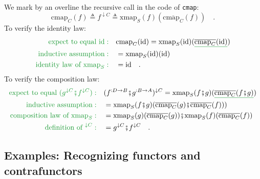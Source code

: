 We mark by an overline the recursive call in the code of \lstinline!cmap!:
\[
\text{cmap}_{C}(f)\triangleq f^{\downarrow C}\triangleq\text{xmap}_{S}(f)(\overline{\text{cmap}_{C}}(f))\quad.
\]
To verify the identity law:
\begin{align*}
{\color{greenunder}\text{expect to equal }\text{id}:}\quad & \text{cmap}_{C}(\text{id})=\text{xmap}_{S}(\text{id})(\gunderline{\overline{\text{cmap}_{C}}(\text{id})})\\
{\color{greenunder}\text{inductive assumption}:}\quad & =\text{xmap}_{S}(\text{id})(\text{id})\\
{\color{greenunder}\text{identity law of }\text{xmap}_{S}:}\quad & =\text{id}\quad.
\end{align*}
To verify the composition law:
\begin{align*}
{\color{greenunder}\text{expect to equal }(g^{\downarrow C}\bef f^{\downarrow C}):}\quad & (f^{:D\rightarrow B}\bef g^{:B\rightarrow A})^{\downarrow C}=\text{xmap}_{S}(f\bef g)(\gunderline{\overline{\text{cmap}_{C}}(f\bef g)})\\
{\color{greenunder}\text{inductive assumption}:}\quad & =\text{xmap}_{S}(f\bef g)(\overline{\text{cmap}_{C}}(g)\bef\overline{\text{cmap}_{C}}(f)))\\
{\color{greenunder}\text{composition law of }\text{xmap}_{S}:}\quad & =\text{xmap}_{S}(g)(\overline{\text{cmap}_{C}}(g))\bef\text{xmap}_{S}(f)(\overline{\text{cmap}_{C}}(f))\\
{\color{greenunder}\text{definition of }^{\downarrow C}:}\quad & =g^{\downarrow C}\bef f^{\downarrow C}\quad.
\end{align*}


\subsection{Examples: Recognizing functors and contrafunctors\label{subsec:Solved-examples:-How-to-recognize-functors}}

